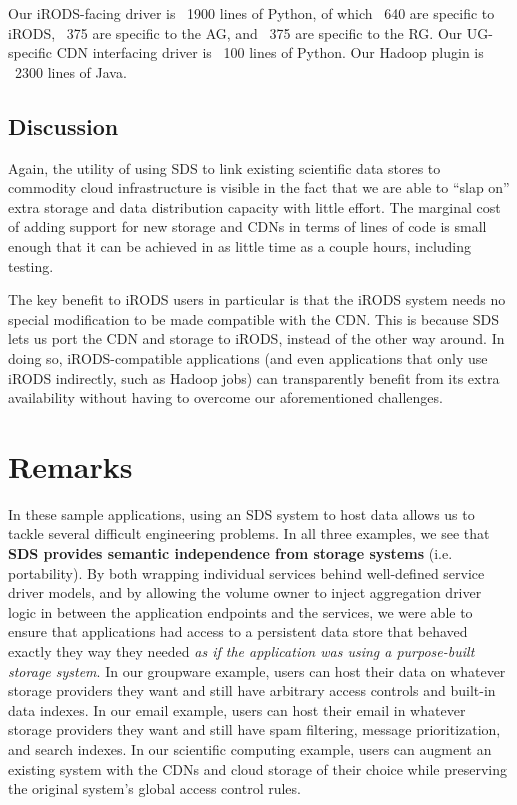 Our iRODS-facing driver is ~1900 lines of Python, of which ~640 are specific to
iRODS, ~375 are specific to the AG, and ~375 are specific to the RG.  Our
UG-specific CDN interfacing driver is ~100 lines of Python.  Our Hadoop plugin
is ~2300 lines of Java.

\subsection{Discussion}

Again, the utility of using SDS to link existing scientific data stores to
commodity cloud infrastructure is visible in the fact that we are able to ``slap
on'' extra storage and data distribution capacity with little effort.  The
marginal cost of adding support for new storage and CDNs in terms of lines of
code is small enough that it can be achieved in as little time as a couple
hours, including testing.

The key benefit to iRODS users in particular is that the iRODS system needs no
special modification to be made compatible with the CDN.  This is because
SDS lets us port the CDN and storage to iRODS, instead of the other way around.
In doing so, iRODS-compatible applications (and even applications that only use
iRODS indirectly, such as Hadoop jobs) can transparently benefit from its extra
availability without having to overcome our aforementioned challenges.

\section{Remarks}

In these sample applications, using an SDS system to host data allows us to
tackle several difficult engineering problems.  In all three examples, we see
that \textbf{SDS provides semantic independence from storage systems} (i.e.
portability).  By both wrapping individual services behind well-defined service driver models, and by
allowing the volume owner to inject aggregation driver logic in between the
application endpoints and the services, we were able to ensure that applications
had access to a persistent data store that behaved exactly they way they needed
\emph{as if the application was using a purpose-built storage system}.
In our groupware example, users can
host their data on whatever storage providers they want and still have arbitrary
access controls and built-in data indexes.  In our email example, users can host
their email in whatever storage providers they want and still have spam
filtering, message prioritization, and search indexes.  In our scientific
computing example, users can augment an existing system with the CDNs and cloud
storage of their choice while preserving the original system's global access
control rules.

